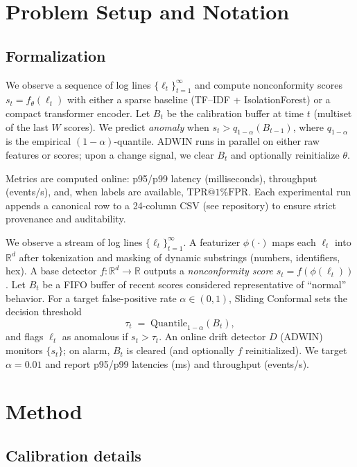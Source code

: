 \documentclass[10pt,twocolumn]{article}
\begin{document}
\section{Problem Setup and Notation}

\subsection*{Formalization}
We observe a sequence of log lines $\{\ell_t\}_{t=1}^{\infty}$ and compute nonconformity scores $s_t = f_\theta(\ell_t)$ with either a sparse baseline (TF--IDF + IsolationForest) or a compact transformer encoder. Let $B_t$ be the calibration buffer at time $t$ (multiset of the last $W$ scores). We predict \emph{anomaly} when $s_t > q_{1-\alpha}(B_{t-1})$, where $q_{1-\alpha}$ is the empirical $(1{-}\alpha)$-quantile. ADWIN runs in parallel on either raw features or scores; upon a change signal, we clear $B_t$ and optionally reinitialize $\theta$.

Metrics are computed online: p95/p99 latency (milliseconds), throughput (events/s), and, when labels are available, $\mathrm{TPR}@1\% \mathrm{FPR}$. Each experimental run appends a canonical row to a 24-column CSV (see repository) to ensure strict provenance and auditability.


We observe a stream of log lines $\{\ell_t\}_{t=1}^{\infty}$. A featurizer $\phi(\cdot)$ maps each $\ell_t$ into $\mathbb{R}^d$ after tokenization and masking of dynamic substrings (numbers, identifiers, hex). A base detector $f:\mathbb{R}^d\!\to\!\mathbb{R}$ outputs a \emph{nonconformity score} $s_t=f(\phi(\ell_t))$. Let $B_t$ be a FIFO buffer of recent scores considered representative of ``normal'' behavior. For a target false-positive rate $\alpha\in(0,1)$, Sliding Conformal sets the decision threshold
\begin{equation}
\tau_t \;=\; \mathrm{Quantile}_{1-\alpha}(B_t),
\end{equation}
and flags $\ell_t$ as anomalous if $s_t>\tau_t$. An online drift detector $D$ (ADWIN) monitors $\{s_t\}$; on alarm, $B_t$ is cleared (and optionally $f$ reinitialized). We target $\alpha{=}0.01$ and report p95/p99 latencies (ms) and throughput (events/s).

\section{Method}

\subsection*{Calibration details}
\end{document}
